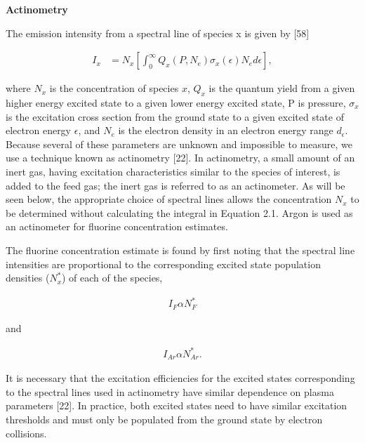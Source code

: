\noindent\large\bf Actinometry

\normalsize\normalfont The emission intensity from a spectral line of species x is given by [58]

\begin{align}
	I_{x} &= N_{x} \left[ \int_{0}^{\infty} Q_{x}\left( P,N_e \right) \sigma_{x} \left( \epsilon \right) N_{e} d\epsilon   \right],
\end{align}




\noindent where $N_{x}$ is the concentration of species $x$, $Q_{x}$ is the quantum yield from a given higher energy excited state to a given lower energy excited state, P is pressure, $\sigma_{x}$ is the excitation cross section from the ground state to a given excited state of electron energy $\epsilon$, and $N_{e}$ is the electron density in an electron energy range $d_{\epsilon}$. Because several of these parameters are unknown and impossible to measure, we use a technique known as actinometry [22]. In actinometry, a small amount of an inert gas, having excitation characteristics similar to the species of interest, is added to the feed gas; the inert gas is referred to as an actinometer. As will be seen below, the appropriate choice of spectral lines allows the concentration $N_{x}$ to be determined without calculating the integral in Equation 2.1. Argon is used as an actinometer for fluorine concentration estimates.

The fluorine concentration estimate is found by first noting that the spectral line intensities are proportional to the corresponding excited state population densities ($N_{x}^{*}$) of each of the species,

\begin{align}
	I_{F} \alpha N_{F}^{*}
\end{align}

\noindent and

\begin{align}
	I_{Ar} \alpha N_{Ar}^{*}.
\end{align}


\noindent It is necessary that the excitation efficiencies for the excited states corresponding to the spectral lines used in actinometry have similar dependence on plasma parameters [22]. In practice, both excited states need to have similar excitation thresholds and must only be populated from the ground state by electron collisions.

